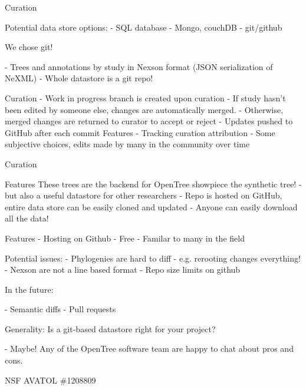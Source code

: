 \documentclass[a4paper,10pt]{article}
\begin{document}
Curation

 Potential data store options:
 - SQL database
 - Mongo, couchDB
 - git/github


 We chose git!

 - Trees and annotations by study in Nexson format  
(JSON serialization of NeXML)
 - Whole datastore is a git repo!  
 

 Curation
- Work in progress branch is created upon curation  
- If study hasn't been edited by someone else, changes are automatically merged.  
- Otherwise, merged changes are returned to curator to accept or reject
- Updates pushed to GitHub after each commit
 Features
 - Tracking curation attribution  
- Some subjective choices, edits made by many in the community over time

 Curation

 Features
 These trees are the backend for OpenTree showpiece  
 the synthetic tree!
 - but also a useful datastore for other researchers
 - Repo is hosted on GitHub, entire data store can be easily cloned and updated
 - Anyone can easily download all the data!
 
 Features
- Hosting on Github  
- Free  
- Familar to  many in the field


 Potential issues:
 - Phylogenies are hard to diff - e.g. rerooting changes everything!
 - Nexson are not a line based format
 - Repo size limits on github


 In the future:

 - Semantic diffs  
 - Pull requests
 
  
Generality:
Is a git-based datastore right for your project?

 - Maybe! Any of the OpenTree software team are happy to chat about pros and cons.

NSF AVATOL \#1208809  
\end{document}
